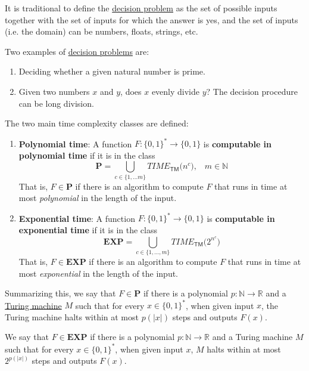  It is traditional to define the \hyperref[def:decision-problem]{decision problem} as the set of possible inputs together with the set of inputs for which the answer is yes, and the set of inputs (i.e. the domain) can be numbers, floats, strings, etc. 

  \begin{example}
    \label{ex:examples-of-decision-problems}
    Two examples of \hyperref[def:decision-problem]{decision problems} are: 
    \begin{enumerate}
      \item Deciding whether a given natural number is prime. 
      \item Given two numbers $x$ and $y$, does $x$ evenly divide $y$? The decision procedure can be long division. 
    \end{enumerate}
  \end{example}

  \begin{definition}
    \label{def:polynomial-and-exponential-time}
  The two main time complexity classes are defined: 
  \begin{enumerate}
      \item \textbf{Polynomial time}: A function $F: \{0,1\}^* \to \{0,1\}$ is \textbf{computable in polynomial time} if it is in the class
      \begin{equation}
        \mathbf{P} = \bigcup_{c \in \{1, ...m\}} TIME_{\mathsf{TM}} \big( n^c \big), \;\;\; m \in \mathbb{N}
      \end{equation}
      That is, $F \in \mathbf{P}$ if there is an algorithm to compute $F$ that runs in time at most \textit{polynomial} in the length of the input. 
      \item \textbf{Exponential time}: A function $F: \{0,1\}^* \to \{0,1\}$ is \textbf{computable in exponential time} if it is in the class 
      \begin{equation}
        \mathbf{EXP} = \bigcup_{c \in \{1, ..., m\}} TIME_{\mathsf{TM}} \big( 2^{n^c}\big)
      \end{equation}
      That is, $F \in \mathbf{EXP}$ if there is an algorithm to compute $F$ that runs in time at most \textit{exponential} in the length of the input. 
  \end{enumerate}
  Summarizing this, we say that $F \in \mathbf{P}$ if there is a polynomial $p: \mathbb{N} \to \mathbb{R}$ and a \hyperref[def:turing-machine]{Turing machine} $M$ such that for every $x \in \{0,1\}^*$, when given input $x$, the Turing machine halts within at most $p(|x|)$ steps and outputs $F(x)$. 

  We say that $F \in \mathbf{EXP}$ if there is a polynomial $p: \mathbb{N} \to \mathbb{R}$ and a Turing machine $M$ such that for every $x \in \{0,1\}^*$, when given input $x$, $M$ halts within at most $2^{p(|x|)}$ steps and outputs $F(x)$. 
  \end{definition}

